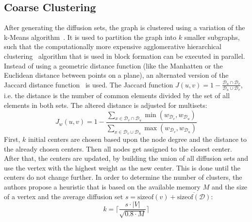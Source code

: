     \subsection*{Coarse Clustering}
    After generating the diffusion sets, the graph is clustered using a variation of the k-Means algorithm~\autocite{lloyd1982least}. 
    It is used to partition the graph into $k$ smaller subgraphs, such that the computationally more expensive agglomerative hierarchical clustering~\autocite{hac} algorithm that is used in block formation can be executed in parallel.
    Instead of using a geometric distance function (like the Manhatten or the Euclidean distance between points on a plane), an alternated version of the Jaccard distance function~\autocite{jaccard1912distribution} is used. 
    The Jaccard function $J(u, v) = 1 - \frac{\mathcal{D}_u \cap \mathcal{D}_v}{\mathcal{D}_u \cup \mathcal{D}_v}$, i.e. the distance is the number of common elements divided by the set of all elements in both sets. 
    The altered distance is adjusted for multisets:  
    \[J_w (u, v) = 1 - \frac{\sum_{x \in \mathcal{D}_v \cap \mathcal{D}_u} \min (w_{\mathcal{D}_v}, w_{\mathcal{D}_u})}{\sum_{x \in \mathcal{D}_v \cup \mathcal{D}_u} \max (w_{\mathcal{D}_v}, w_{\mathcal{D}_u})} \]
    First, $k$ initial centers are chosen based upon the node degree and the distance to the already chosen centers.
    Then all nodes get assigned to the closest center. 
    After that, the centers are updated, by building the union of all diffusion sets and use the vertex with the highest weight as the new center.
    This is done until the centers do not change further.
    In order to determine the number of clusters, the authors propose a heuristic that is based on the available memory $M$ and the size of a vertex and the average diffusion set $s = \text{sizeof}(v) + \overline{\text{sizeof}(\mathcal{D})}$: 
    \[ k = \lceil \frac{s \cdot |V|}{\sqrt{0.8 \cdot M}} \rceil \]
    
